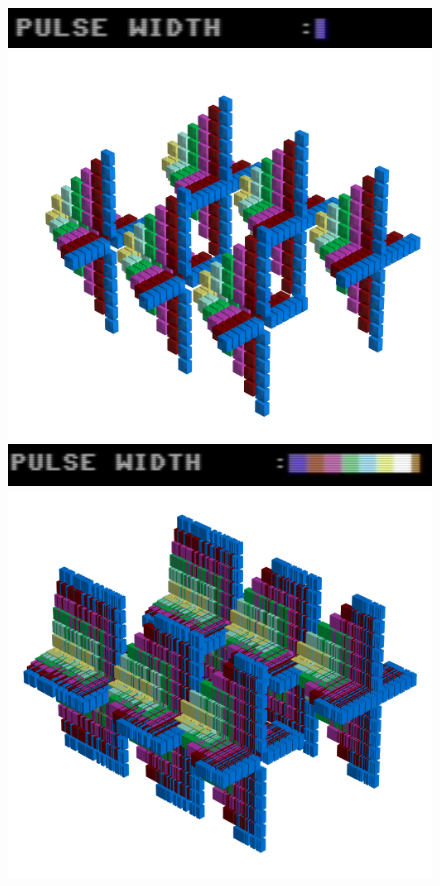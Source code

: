 \begin{figure}[H]
    \centering
    \begin{adjustbox}{width=3cm,margin=11cm -12cm}
      \includegraphics[width=12cm]{src/pulsewidth/pulsewidth-low.png}%
    \end{adjustbox}
    \begin{adjustbox}{width=10.5cm,center}
      \includegraphics[width=12cm]{src/pulsewidth/pattern0-45.png}%
    \end{adjustbox}
    \begin{adjustbox}{width=3cm,margin=11cm -12cm}
      \includegraphics[width=12cm]{src/pulsewidth/pulsewidth-high.png}%
    \end{adjustbox}
    \begin{adjustbox}{width=10.5cm,margin=0cm -2cm}
      \includegraphics[width=12cm]{src/pulsewidth/pattern1-45.png}%

\end{adjustbox}
\end{figure}
